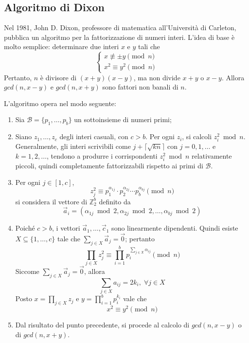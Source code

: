 %
\subsection{Algoritmo di Dixon}
%

Nel 1981, John D. Dixon, professore di matematica all'Università di Carleton, pubblica un algoritmo per la fattorizzazione di numeri interi. L'idea di base è molto semplice: determinare due interi $x$ e $y$ tali che 
\begin{equation*}
	\begin{cases}
		x \not\equiv \pm y \pmod{n} \\
		x^2 \equiv y^2 \pmod{n}
	\end{cases}
\end{equation*}
Pertanto, $n$ è divisore di $(x+y)(x-y)$, ma non divide $x+y$ o $x-y$. Allora $gcd(n, x-y)$ e $gcd(n, x+y)$ sono fattori non banali di $n$.

L'algoritmo opera nel modo seguente:
\begin{enumerate}
	\item Sia $\mathcal{B} = \{p_1, \dotsc, p_b\}$ un sottoinsieme di numeri primi;
	\item Siano $z_1, \dotsc, z_c$ degli interi casuali, con $c>b$. Per ogni $z_i$, si calcoli $z_i^2 \bmod n$. Generalmente, gli interi scrivibili come $j + \lceil \sqrt{kn} \rceil$ con $j = 0, 1, \dotsc$ e $k = 1, 2, \dotsc$, tendono a produrre i corrispondenti $z_i^2 \bmod n$ relativamente piccoli, quindi completamente fattorizzabili rispetto ai primi di $\mathcal{B}$. 
	\item Per ogni $j \in [1, c]$, \[ z_j^2 \equiv p_1^{\alpha_{1j}} \cdot p_2^{\alpha_{2j}} \dotsm p_b^{\alpha_{bj}} \pmod{n} \] si considera il vettore di $\mathbb{Z}_2^b$ definito da \[ \vec{a}_i = (\alpha_{1j} \bmod 2, \alpha_{2j} \bmod 2, \dotsc, \alpha_{bj} \bmod 2) \]
	\item Poiché $c>b$, i vettori $\vec{a}_1, \dotsc, \vec{c}_1$ sono linearmente dipendenti. Quindi esiste $X \subseteq \{1, \dotsc, c\}$ tale che $\sum_{j \in X} \vec{a}_j = \vec{0}$; pertanto \[ \prod_{j \in X} z_j^2 \equiv \prod_{i = 1}^b p_i^{\sum_{j \in X} \alpha_{ij}} \pmod{n} \]
	Siccome $\sum_{j\in X} \vec{a}_j = \vec{0}$, allora \[ \sum_{j\in X} a_{ij} = 2k_i,\;\forall j \in X \]
	Posto $x = \prod_{j \in X} z_j$ e $y = \prod_{i=1}^b p_i^{k_i}$ vale che \[ x^2 \equiv y^2 \pmod{n} \]
	\item Dal risultato del punto precedente, si procede al calcolo di $gcd(n, x-y)$ o di $gcd(n, x+y)$.
\end{enumerate}


